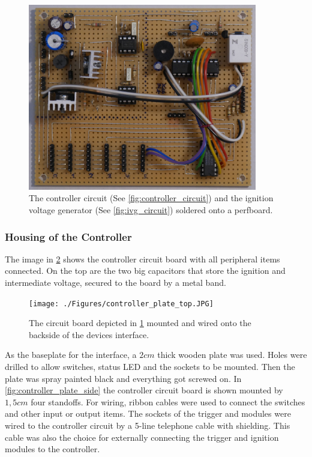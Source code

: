 \begin{figure}[!ht]
    \centering
    \includegraphics[width=10cm]{./Figures/controller_circuit_soldered.JPG}
    \caption{The controller circuit (See \cref{fig:controller_circuit}) and the ignition voltage generator (See \cref{fig:ivg_circuit}) soldered onto a perfboard.   }
    \label{fig:controller_circuit_soldered}     
\end{figure}

\pagebreak

\subsubsection{Housing of the Controller}
\label{Housing of the Controller}

\noindent The image in \cref{fig:controller_plate_top} shows the controller circuit board with all peripheral items connected. On the top are the two big capacitors that store the ignition and intermediate voltage, secured to the board by a metal band.\\

\begin{figure}[!ht]
    \centering
    \texttt{[image: ./Figures/controller\_plate\_top.JPG]}
    \caption{ The circuit board depicted in \cref{fig:controller_circuit_soldered} mounted and wired onto the backside of the devices interface. }
    \label{fig:controller_plate_top}     
\end{figure}

\noindent As the baseplate for the interface, a $2cm$ thick wooden plate was used. Holes were drilled to allow switches, status LED and the sockets to be mounted. Then the plate was spray painted black and everything got screwed on. In \cref{fig:controller_plate_side} the controller circuit board is shown mounted by $1,5cm$ four standoffs. For wiring, ribbon cables were used to connect the switches and other input or output items. The sockets of the trigger and modules were wired to the controller circuit by a 5-line telephone cable with shielding. This cable was also the choice for externally connecting the trigger and ignition modules to the controller. 

